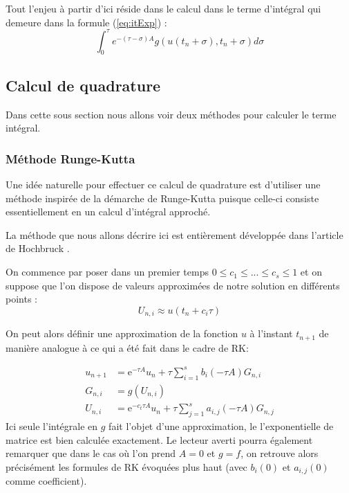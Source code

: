Tout l'enjeu à partir d'ici réside dans le calcul dans le terme d'intégral qui demeure dans la formule (\ref{eq:itExp}) :
$$
\int_{0}^{\tau} e^{-(\tau-\sigma) A} g\left(u\left(t_{n}+\sigma\right),t_n+\sigma\right) d \sigma
$$

\subsection{Calcul de quadrature}
Dans cette sous section nous allons voir deux méthodes pour calculer le terme intégral.
\subsubsection{Méthode Runge-Kutta}
Une idée naturelle pour effectuer ce calcul de quadrature est d'utiliser une méthode inspirée de la démarche de Runge-Kutta puisque celle-ci consiste essentiellement en un calcul d'intégral approché.

La méthode que nous allons décrire ici est entièrement développée dans l'article de Hochbruck \cite{ExpIntegrators}.

On commence par poser dans un premier temps $0 \leq c_1 \leq ... \leq c_s \leq 1$
et on suppose que l'on dispose de valeurs approximées de notre solution en différents points :
\begin{equation}
    U_{n,i} \approx u(t_n + c_i \tau)
\end{equation}

On peut alors définir une approximation de la fonction $u$ à l'instant $t_{n+1}$ de manière analogue à ce qui a été fait dans le cadre de RK:

\begin{equation} 
    \begin{aligned} u_{n+1} &=\mathrm{e}^{-\tau A} u_{n}+\tau \sum_{i=1}^{s} b_{i}(-\tau A) G_{n,i} \\
    G_{n,i} &=g\left(U_{n,i}\right) \\
    U_{n,i} &=\mathrm{e}^{-c_{t} \tau A} u_{n}+\tau \sum_{j=1}^{s} a_{i,j}(-\tau A) G_{n,j} \end{aligned}
\end{equation}
Ici seule l'intégrale en $g$ fait l'objet d'une approximation, le l'exponentielle de matrice est bien calculée exactement. Le lecteur averti pourra également remarquer que dans le cas où l'on prend $A=0$ et $g=f$, on retrouve alors précisément les formules de RK évoquées plus haut (avec $b_i(0)$ et $a_{i,j}(0)$ comme coefficient).

